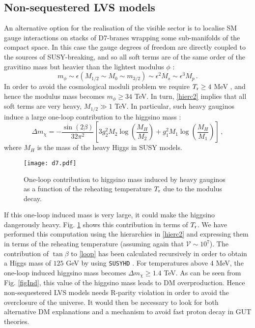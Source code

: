 \documentclass[11pt,a4paper]{article}
\newcommand{\be}{\begin{equation}}
\newcommand{\ee}{\end{equation}}
\newcommand{\mc}{\mathcal}
\begin{document}
\subsection{Non-sequestered LVS models}
\label{sec:NonSequestered}

An alternative option for the realisation of the visible sector is to localise SM gauge interactions on stacks of D7-branes wrapping some sub-manifolds of the compact space. In this case the gauge degrees of freedom are directly coupled to the sources of SUSY-breaking, and so all soft terms are of the same order of the gravitino mass but heavier than the lightest modulus $\phi$ \cite{Aparicio:2015psl}: 
\be
m_\phi \sim \epsilon \left ( M_{1/2}\sim M_0 \sim m_{3/2} \right)  \sim \epsilon^2 M_s \sim  \epsilon^3 M_p\,.
\label{hierc2}
\ee
In order to avoid the cosmological moduli problem we require $T_{\rm r}\geq 4$ MeV \cite{Hannestad:2004px}, and hence the modulus mass becomes $m_\phi\geq 34$ TeV. In turn, \eqref{hierc2} implies that all soft terms are very heavy, $M_{1/2}\gg 1 $ TeV. In particular, such heavy gauginos induce a large one-loop contribution to the higgsino mass \cite{Hall:2011jd}:
\be
\Delta m_{\chi} = -\frac{\sin(2\beta)}{32 \pi^2}\left[ 3g_2^2 M_2 \log\left(\frac{M_H}{M_2}\right) + g_1^2 M_1 \log\left(\frac{M_H}{M_1}\right) \right]\,,
\label{loop}
\ee
where $M_H$ is the mass of the heavy Higgs in SUSY models. 

\begin{figure}[!t]
\centering
\texttt{[image: d7.pdf]}
\caption{One-loop contribution to higgsino mass induced by heavy gauginos as a function of the reheating temperature $T_{\rm r}$ due to the modulus decay.}
\label{Fig5}
\end{figure}

If this one-loop induced mass is very large, it could make the higgsino dangerously heavy. Fig. \ref{Fig5} shows this contribution in terms of $T_{\rm r}$. We have performed this computation using the hierarchies in \eqref{hierc2} and expressing them in terms of the reheating temperature (assuming again that $\mc{V}\sim 10^7$). The contribution of $\tan\beta$ to \eqref{loop} has been calculated recursively in order to obtain a Higgs mass of $125$ GeV by using \texttt{SUSYHD} \cite{Vega:2015fna}. For temperatures above $4$ MeV, the one-loop induced higgsino mass becomes $\Delta m_\chi\geq1.4$ TeV. As can be seen from Fig. \ref{figInd}, this value of the higgsino mass leads to DM overproduction. Hence non-sequestered LVS models needs R-parity violation in order to avoid the overclosure of the universe. It would then be necessary to look for both alternative DM explanations and a mechanism to avoid fast proton decay in GUT theories.
\end{document}
